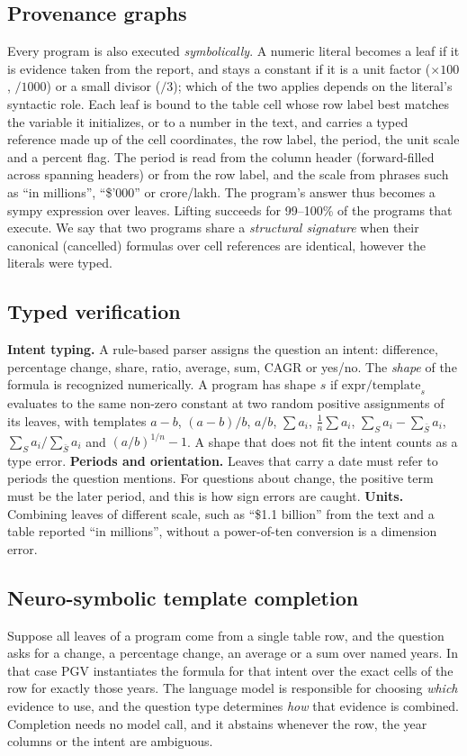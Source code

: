 \documentclass[conference]{IEEEtran}
\begin{document}
\subsection{Provenance graphs}
Every program is also executed \emph{symbolically}. A numeric literal becomes a leaf if it is evidence taken from the report, and stays a constant if it is a unit factor ($\times100$, $/1000$) or a small divisor ($/3$); which of the two applies depends on the literal's syntactic role. Each leaf is bound to the table cell whose row label best matches the variable it initializes, or to a number in the text, and carries a typed reference made up of the cell coordinates, the row label, the period, the unit scale and a percent flag. The period is read from the column header (forward-filled across spanning headers) or from the row label, and the scale from phrases such as ``in millions'', ``\$'000'' or crore/lakh. The program's answer thus becomes a sympy expression over leaves. Lifting succeeds for 99--100\% of the programs that execute. We say that two programs share a \emph{structural signature} when their canonical (cancelled) formulas over cell references are identical, however the literals were typed.

\subsection{Typed verification}
\textbf{Intent typing.} A rule-based parser assigns the question an intent: difference, percentage change, share, ratio, average, sum, CAGR or yes/no. The \emph{shape} of the formula is recognized numerically. A program has shape $s$ if $\mathrm{expr}/\mathrm{template}_s$ evaluates to the same non-zero constant at two random positive assignments of its leaves, with templates $a{-}b$, $(a{-}b)/b$, $a/b$, $\sum a_i$, $\frac1n\sum a_i$, $\sum_{S}a_i-\sum_{\bar S}a_i$, $\sum_S a_i/\sum_{\bar S}a_i$ and $(a/b)^{1/n}{-}1$. A shape that does not fit the intent counts as a type error.
\textbf{Periods and orientation.} Leaves that carry a date must refer to periods the question mentions. For questions about change, the positive term must be the later period, and this is how sign errors are caught.
\textbf{Units.} Combining leaves of different scale, such as ``\$1.1 billion'' from the text and a table reported ``in millions'', without a power-of-ten conversion is a dimension error.

\subsection{Neuro-symbolic template completion}
Suppose all leaves of a program come from a single table row, and the question asks for a change, a percentage change, an average or a sum over named years. In that case PGV instantiates the formula for that intent over the exact cells of the row for exactly those years. The language model is responsible for choosing \emph{which} evidence to use, and the question type determines \emph{how} that evidence is combined. Completion needs no model call, and it abstains whenever the row, the year columns or the intent are ambiguous.
\end{document}
